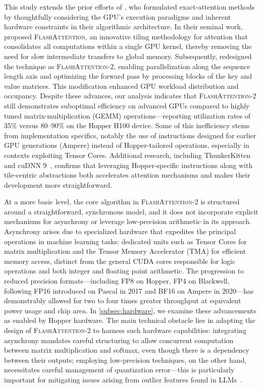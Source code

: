 This study extends the prior efforts of \citet{dao2022flashattention}, who formulated exact-attention methods by thoughtfully considering the GPU’s execution paradigms and inherent hardware constraints in their algorithmic architecture. In their seminal work, \citet{dao2022flashattention} proposed \textsc{FlashAttention}, an innovative tiling methodology for attention that consolidates all computations within a single GPU kernel, thereby removing the need for slow intermediate transfers to global memory. Subsequently, \citet{dao2023flashattention2} redesigned the technique as \textsc{FlashAttention-2}, enabling parallelization along the sequence length axis and optimizing the forward pass by processing blocks of the key and value matrices. This modification enhanced GPU workload distribution and occupancy. Despite these advances, our analysis indicates that \textsc{FlashAttention-2} still demonstrates suboptimal efficiency on advanced GPUs compared to highly tuned matrix-multiplication (GEMM) operations—reporting utilization rates of 35\% versus 80–90\% on the Hopper H100 device. Some of this inefficiency stems from implementation specifics, notably the use of instructions designed for earlier GPU generations (Ampere) instead of Hopper-tailored operations, especially in contexts exploiting Tensor Cores. Additional research, including ThunkerKitten~\citep{spector2024thunder} and cuDNN 9~\citep{cudnn9}, confirms that leveraging Hopper-specific instructions along with tile-centric abstractions both accelerates attention mechanisms and makes their development more straightforward.

At a more basic level, the core algorithm in \textsc{FlashAttention-2} is structured around a straightforward, synchronous model, and it does not incorporate explicit mechanisms for asynchrony or leverage low-precision arithmetic in its approach. Asynchrony arises due to specialized hardware that expedites the principal operations in machine learning tasks: dedicated units such as Tensor Cores for matrix multiplication and the Tensor Memory Accelerator (TMA) for efficient memory access, distinct from the general CUDA cores responsible for logic operations and both integer and floating point arithmetic. The progression to reduced precision formats—including FP8 on Hopper, FP4 on Blackwell, following FP16 introduced on Pascal in 2017 and BF16 on Ampere in 2020—has demonstrably allowed for two to four times greater throughput at equivalent power usage and chip area. In \cref{subsec:hardware}, we examine these advancements as enabled by Hopper hardware. The main technical obstacle lies in adapting the design of \textsc{FlashAttention-2} to harness such hardware capabilities: integrating asynchrony mandates careful structuring to allow concurrent computation between matrix multiplication and softmax, even though there is a dependency between their outputs; employing low-precision techniques, on the other hand, necessitates careful management of quantization error—this is particularly important for mitigating issues arising from outlier features found in LLMs~\citep{dettmers2208llm, sun2024massive}.

